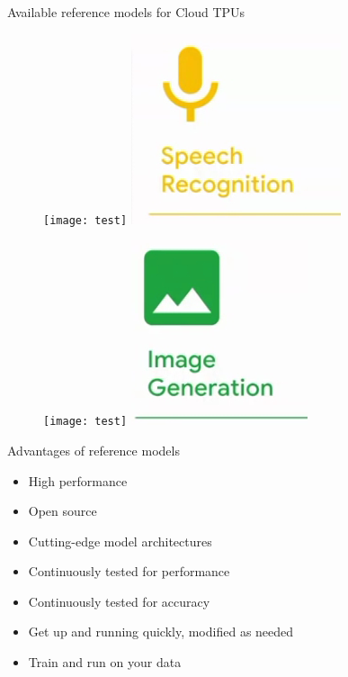 \documentclass[c]{beamer}
\begin{document}
\begin{frame}{Available reference models for Cloud TPUs}
\begin{figure}[ht]
{\begin{minipage}[t]{97pt}
{   }
  \end{minipage}}
  {\begin{minipage}[t]{58pt}
    \texttt{[image: test]}
    \includegraphics[scale=.37]{images/20c.png}\newline
  \end{minipage}}
  \hfill
  {\begin{minipage}[t]{60pt}
    \texttt{[image: test]}
    \includegraphics[scale=.37]{images/20d.png}\newline
  \end{minipage}}
\end{figure}
	    
	\end{frame}
	\begin{frame}{Advantages of reference models}
	\begin{itemize}
	    \item High performance
\item Open source
\item Cutting-edge model architectures
\item Continuously tested for performance
\item Continuously tested for accuracy
\item Get up  and running quickly, modified as needed
\item Train and run on your data
	\end{itemize}
	\end{frame}
	
\end{document}
